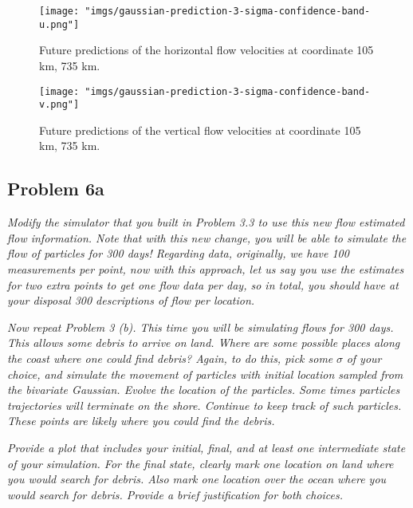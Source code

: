 \documentclass[11pt]{article}
\begin{document}
\begin{figure}[htbp]
    \centering
    \texttt{[image: "imgs/gaussian-prediction-3-sigma-confidence-band-u.png"]} %
    \caption{Future predictions of the horizontal flow velocities at coordinate 105 km, 735 km.}
    \label{fig:gaussian-prediction-3-sigma-confidence-band-u}
\end{figure}
\FloatBarrier

\begin{figure}[htbp]
    \centering
    \texttt{[image: "imgs/gaussian-prediction-3-sigma-confidence-band-v.png"]} %
    \caption{Future predictions of the vertical flow velocities at coordinate 105 km, 735 km.}
    \label{fig:gaussian-prediction-3-sigma-confidence-band-v}
\end{figure}
\FloatBarrier

\subsection{Problem 6a}

\textit{Modify the simulator that you built in Problem 3.3 to use this new flow estimated flow information. Note that with this new change, you will be able to simulate the flow of particles for 300 days! Regarding data, originally, we have 100 measurements per point, now with this approach, let us say you use the estimates for two extra points to get one flow data per day, so in total, you should have at your disposal 300 descriptions of flow per location.}

\textit{Now repeat Problem 3 (b). This time you will be simulating flows for 300 days. This allows some debris to arrive on land. Where are some possible places along the coast where one could find debris? Again, to do this, pick some}
$\sigma$
\textit{of your choice, and simulate the movement of particles with initial location sampled from the bivariate Gaussian. Evolve the location of the particles. Some times particles trajectories will terminate on the shore. Continue to keep track of such particles. These points are likely where you could find the debris.}

\textit{Provide a plot that includes your initial, final, and at least one intermediate state of your simulation. For the final state, clearly mark one location on land where you would search for debris. Also mark one location over the ocean where you would search for debris. Provide a brief justification for both choices.}
\end{document}

